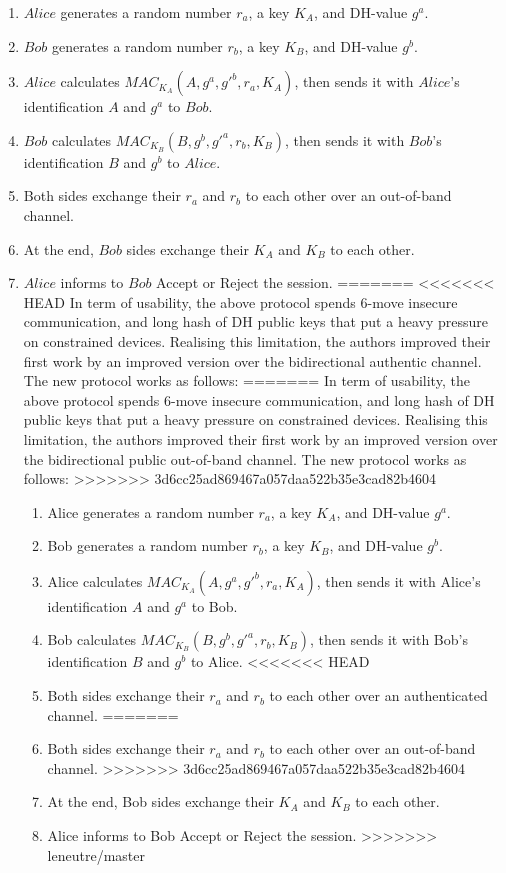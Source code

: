\begin{enumerate}
\item $Alice$ generates a random number $r_a$, a key $K_A$, and DH-value $g^a$.
\item $Bob$ generates a random number $r_b$, a key $K_B$, and DH-value $g^b$.
\item $Alice$ calculates $MAC_{K_A}(A,g^a,g'^b,r_a,K_A)$, then sends it with $Alice$'s identification $A$ and $g^a$ to $Bob$. 
\item $Bob$ calculates $MAC_{K_B}(B,g^b,g'^a,r_b,K_B)$, then sends it with $Bob$'s identification $B$ and $g^b$ to $Alice$.
\item Both sides exchange their $r_a$ and $r_b$ to each other over an out-of-band channel. 
\item At the end, $Bob$ sides exchange their $K_A$ and $K_B$ to each other. 
\item $Alice$ informs to $Bob$ Accept or Reject the session.
=======
<<<<<<< HEAD
In term of usability, the above protocol spends 6-move insecure communication, and long hash of DH public keys that put a heavy pressure on constrained devices. Realising this limitation, the authors improved their first work by an improved version over the bidirectional authentic channel. The new protocol works as follows:
=======
In term of usability, the above protocol spends 6-move insecure communication, and long hash of DH public keys that put a heavy pressure on constrained devices. Realising this limitation, the authors improved their first work by an improved version over the bidirectional public out-of-band channel. The new protocol works as follows:
>>>>>>> 3d6cc25ad869467a057daa522b35e3cad82b4604

\begin{enumerate}
\item Alice generates a random number $r_a$, a key $K_A$, and DH-value $g^a$.
\item Bob generates a random number $r_b$, a key $K_B$, and DH-value $g^b$.
\item Alice calculates $MAC_{K_A}(A,g^a,g'^b,r_a,K_A)$, then sends it with Alice's identification $A$ and $g^a$ to Bob. 
\item Bob calculates $MAC_{K_B}(B,g^b,g'^a,r_b,K_B)$, then sends it with Bob's identification $B$ and $g^b$ to Alice.
<<<<<<< HEAD
\item Both sides exchange their $r_a$ and $r_b$ to each other over an authenticated channel. 
=======
\item Both sides exchange their $r_a$ and $r_b$ to each other over an out-of-band channel. 
>>>>>>> 3d6cc25ad869467a057daa522b35e3cad82b4604
\item At the end, Bob sides exchange their $K_A$ and $K_B$ to each other. 
\item Alice informs to Bob Accept or Reject the session.
>>>>>>> leneutre/master
\end{enumerate}


\end{enumerate}
